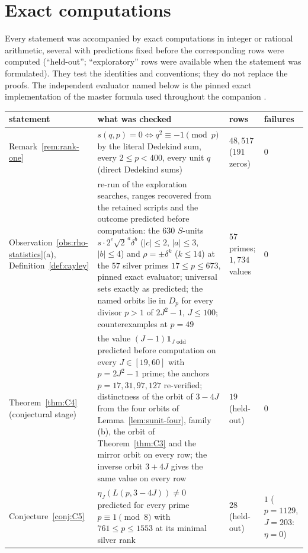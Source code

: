 \documentclass[11pt]{article}
\theoremstyle{definition}
\newcommand{\ind}{\mathbf 1}
\begin{document}
\appendix

\section{Exact computations}
\label{app:verification}

Every statement was accompanied by exact computations in integer or
rational arithmetic, several with predictions fixed before the
corresponding rows were computed (``held-out''; ``exploratory'' rows were
available when the statement was formulated).  They test the identities
and conventions; they do not replace the proofs.  The independent
evaluator named below is the pinned exact implementation of the master
formula used throughout the companion \cite{LensChirality2026}.

\begin{small}
\begin{longtable}{@{}L{0.24\textwidth}L{0.41\textwidth}L{0.2\textwidth}L{0.07\textwidth}@{}}
\toprule
statement & what was checked & rows & failures\\
\midrule
\endhead
Remark~\ref{rem:rank-one} & $s(q,p)=0\iff q^2\equiv-1\pmod p$ by the
literal Dedekind sum, every $2\leq p<400$, every unit $q$
(direct Dedekind sums) & $48{,}517$ ($191$
zeros) & $0$\\
Observation~\ref{obs:rho-statistics}(a), Definition~\ref{def:cayley} &
re-run of the exploration searches, ranges recovered from the retained
scripts and the outcome predicted before computation: the $630$ $S$-units
$s\cdot2^c\sqrt2^{\,a}\delta^b$ ($|c|\leq2$, $|a|\leq3$, $|b|\leq4$) and
$\rho=\pm\delta^k$ ($k\leq14$) at the $57$ silver primes
$17\leq p\leq673$, pinned exact evaluator; universal sets exactly as
predicted; the named orbits lie in $D_p$ for every divisor $p>1$ of
$2J^2-1$, $J\leq100$; counterexamples at $p=49$ &
$57$ primes; $1{,}734$ values & $0$\\
Theorem~\ref{thm:C4} (conjectural stage) & the value
$(J-1)\ind_{J\text{ odd}}$ predicted before computation on every
$J\in[19,60]$ with $p=2J^2-1$ prime; the anchors $p=17,31,97,127$
re-verified; distinctness of the orbit of $3-4J$ from the four orbits of
Lemma~\ref{lem:sunit-four}, family (b), the orbit of
Theorem~\ref{thm:C3} and the mirror orbit on every row; the inverse
orbit $3+4J$ gives the same value on every row & $19$ (held-out) & $0$\\
Conjecture~\ref{conj:C5} & $\eta_J(L(p,3-4J))\neq0$ predicted for every
prime $p\equiv1\pmod8$ with $761\leq p\leq1553$ at its minimal silver
rank & $28$ (held-out) & $1$ ($p=1129$, $J=203$: $\eta=0$)\\

\end{longtable}
\end{small}
\end{document}

